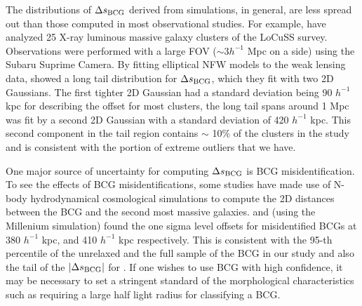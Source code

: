 The distributions of $\Delta s_{\rm BCG}$ derived from simulations, in general, 
are less spread out than those computed in most observational studies.
For example, \cite{Oguri2010} have analyzed 25 X-ray luminous 
massive galaxy clusters of the LoCuSS survey. 
Observations were performed with a large FOV ($\sim 3 h^{-1}$ Mpc on a side) 
using the Subaru Suprime Camera. 
By fitting elliptical NFW models to the weak lensing data, \cite{Oguri2010}
showed a long tail distribution for $\Delta s_{\rm BCG}$, which they fit with two 2D Gaussians.
The first tighter 2D Gaussian had a standard deviation being 90
$h^{-1}$ kpc for describing the
offset for most clusters, the long tail spans around 1 Mpc was fit by a second 2D
Gaussian with a standard deviation of 420 $h^{-1}$ kpc. This second component
in the tail region contains $\sim$ 10\% of the clusters in the study and is
consistent with the portion of extreme outliers that we have.   

One major source of uncertainty for computing $\Delta s_{\rm BCG}$ is
BCG misidentification.
To see the effects of BCG misidentifications, 
some studies have made use of N-body hydrodynamical cosmological
simulations to compute the 2D distances between the BCG and 
the second most massive galaxies. \cite{Johnston2007b} and 
\cite{Hilbert2010} (using the Millenium simulation)  found 
the one sigma level offsets for misidentified BCGs at 380 $h^{-1}$ kpc, and 410 
$h^{-1}$ kpc respectively. This is consistent with the 95-th percentile of the
unrelaxed and the full sample of the BCG in our study and also the tail of the
$|\Delta s_{\rm BCG}|$ for \cite{Cui2015}. If one wishes to use BCG with high
confidence, it may be necessary to set a stringent standard of the morphological
characteristics such as requiring a large half light radius for classifying a BCG.

